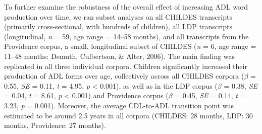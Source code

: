 \documentclass[10pt, letterpaper]{article}
\begin{document}
To further examine the robustness of the overall effect of increasing
ADL word production over time, we ran subset analyses on all CHILDES
transcripts (primarily cross-sectional, with hundreds of children), all
LDP transcripts (longitudinal, \emph{n} = 59, age range = 14--58
months), and all transcripts from the Providence corpus, a small,
longitudinal subset of CHILDES (\emph{n} = 6, age range = 11--48 months:
Demuth, Culbertson, \& Alter, 2006). The main finding was replicated in
all three individual corpora. Children significantly increased their
production of ADL forms over age, collectively across all CHILDES
corpora (\(\beta\) = 0.55, \emph{SE} = 0.11, \emph{t} = 4.95, \emph{p}
\textless{} 0.001), as well as in the LDP corpus (\(\beta\) = 0.38,
\emph{SE} = 0.04, \emph{t} = 8.61, \emph{p} \textless{} 0.001) and
Providence corpus (\(\beta\) = 0.45, \emph{SE} = 0.14, \emph{t} = 3.23,
\emph{p} = 0.001). Moreover, the average CDL-to-ADL transition point was
estimated to be around 2.5 years in all corpora (CHILDES: 28 months,
LDP: 30 months, Providence: 27 months).
\end{document}
